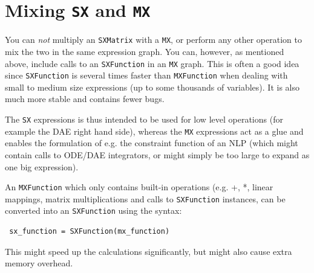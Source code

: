 \documentclass[a4paper,12pt]{book}
\begin{document}
{\section{Mixing \texttt{SX} and \texttt{MX}}
You can \emph{not} multiply an \texttt{SXMatrix} with a \texttt{MX}, or perform any other operation to mix the two in the same expression graph. You can, however, as mentioned above, include calls to an \texttt{SXFunction} in an \texttt{MX} graph. This is often a good idea since \texttt{SXFunction} is several times faster than \texttt{MXFunction} when dealing with small to medium size expressions (up to some thousands of variables). It is also much more stable and contains fewer bugs. 

The \texttt{SX} expressions is thus intended to be used for low level operations (for example the DAE right hand side), whereas the \texttt{MX} expressions act as a glue and enables the formulation of e.g. the constraint function of an NLP (which might contain calls to ODE/DAE integrators, or might simply be too large to expand as one big expression).

An \texttt{MXFunction} which only contains built-in operations (e.g. +, *, linear mappings, matrix multiplications and calls to \texttt{SXFunction} instances, can be converted into an \texttt{SXFunction} using the syntax:
\begin{verbatim}
 sx_function = SXFunction(mx_function)
\end{verbatim}

This might speed up the calculations significantly, but might also cause extra memory overhead.


}
\end{document}
